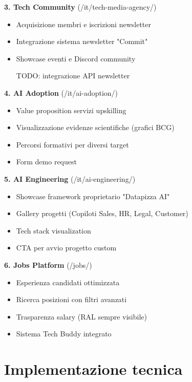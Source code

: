 \textbf{3. Tech Community} (/it/tech-media-agency/)
\begin{itemize}
  \item Acquisizione membri e iscrizioni newsletter
  \item Integrazione sistema newsletter "Commit"
  \item Showcase eventi e Discord community
  \item [TODO: integrazione API newsletter]
\end{itemize}

\textbf{4. AI Adoption} (/it/ai-adoption/)
\begin{itemize}
  \item Value proposition servizi upskilling
  \item Visualizzazione evidenze scientifiche (grafici BCG)
  \item Percorsi formativi per diversi target
  \item Form demo request
\end{itemize}

\textbf{5. AI Engineering} (/it/ai-engineering/)
\begin{itemize}
  \item Showcase framework proprietario "Datapizza AI"
  \item Gallery progetti (Copiloti Sales, HR, Legal, Customer)
  \item Tech stack visualization
  \item CTA per avvio progetto custom
\end{itemize}

\textbf{6. Jobs Platform} (/jobs/)
\begin{itemize}
  \item Esperienza candidati ottimizzata
  \item Ricerca posizioni con filtri avanzati
  \item Trasparenza salary (RAL sempre visibile)
  \item Sistema Tech Buddy integrato
\end{itemize}

\section{Implementazione tecnica}

